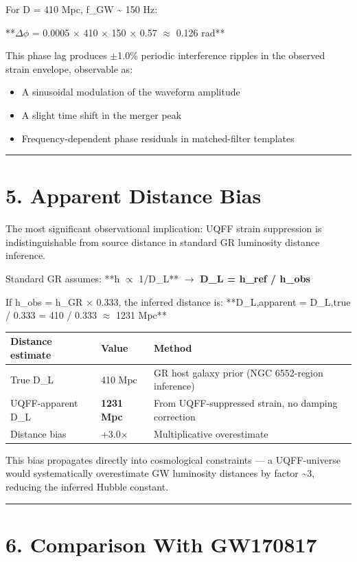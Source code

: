 \documentclass[11pt]{article}
\begin{document}
For D = 410 Mpc, f\_GW \textasciitilde{} 150 Hz:

**$\Delta$$\phi$ = 0.0005 $\times$ 410 $\times$ 150 $\times$ 0.57 $\approx$ 0.126 rad**

This phase lag produces $\pm$1.0\% periodic interference ripples in the observed strain envelope, observable as:

\begin{itemize}
  \item A sinusoidal modulation of the waveform amplitude
  \item A slight time shift in the merger peak
  \item Frequency-dependent phase residuals in matched-filter templates
\end{itemize}

\noindent\rule{\textwidth}{0.4pt}

\section*{5. Apparent Distance Bias}

The most significant observational implication: UQFF strain suppression is indistinguishable from source distance in standard GR luminosity distance inference.

Standard GR assumes: **h $\propto$ 1/D\_L** $\to$ \textbf{D\_L = h\_ref / h\_obs}

If h\_obs = h\_GR $\times$ 0.333, the inferred distance is: **D\_L,apparent = D\_L,true / 0.333 = 410 / 0.333 $\approx$ 1231 Mpc**

\begin{center}
\begin{longtable}{lll}
\toprule
Distance estimate & Value & Method \tabularnewline
\midrule
\endhead
True D\_L & 410 Mpc & GR host galaxy prior (NGC 6552-region inference) \tabularnewline
UQFF-apparent D\_L & \textbf{1231 Mpc} & From UQFF-suppressed strain, no damping correction \tabularnewline
Distance bias & +3.0$\times$ & Multiplicative overestimate \tabularnewline
\bottomrule
\end{longtable}
\end{center}

This bias propagates directly into cosmological constraints --- a UQFF-universe would systematically overestimate GW luminosity distances by factor \textasciitilde{}3, reducing the inferred Hubble constant.

\noindent\rule{\textwidth}{0.4pt}

\section*{6. Comparison With GW170817}
\end{document}

